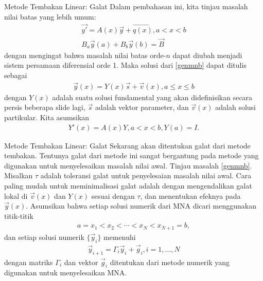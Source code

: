 \documentclass[xcolor={dvipsnames}, 9pt]{beamer}
\begin{document}
	\begin{frame}{Metode Tembakan Linear: Galat}
		Dalam pembahasan ini, kita tinjau masalah nilai batas yang lebih umum:
		\begin{gather}
			\vec{y'} = A(x)\vec{y} + \vec{q(x)}, a<x<b \nonumber \\
			B_a\vec{y}(a) + B_b\vec{y}(b) = \vec{B} \label{genmnb}
		\end{gather}
		dengan mengingat bahwa masalah nilai batas orde-$n$ dapat diubah menjadi sistem persamaan diferensial orde 1. Maka solusi dari \eqref{genmnb} dapat ditulis sebagai
		\begin{align*}
			\vec{y}(x) = Y(x)\vec{s} + \vec{v}(x), a\leq x\leq b
		\end{align*}
		dengan $Y(x)$ adalah suatu solusi fundamental yang akan didefinisikan secara persis beberapa slide lagi, $\vec{s}$ adalah vektor parameter, dan $\vec{v}(x)$ adalah solusi partikular. Kita asumsikan
		\begin{align*}
			Y'(x) = A(x)Y, a<x<b, Y(a) = I.
		\end{align*} 
	\end{frame}
	\begin{frame}{Metode Tembakan Linear: Galat}
		Sekarang akan ditentukan galat dari metode tembakan. Tentunya galat dari metode ini sangat bergantung pada metode yang digunakan untuk menyelesaikan masalah nilai awal. Tinjau masalah \eqref{genmnb}. \newline
		Misalkan $\tau$ adalah toleransi galat untuk penyelesaian masalah nilai awal. Cara paling mudah untuk meminimalisasi galat adalah dengan mengendalikan galat lokal di $\vec{v}(x)$ dan $Y(x)$ sesuai dengan $\tau$, dan menentukan efeknya pada $\vec{y}(x)$. \newline
		Asumsikan bahwa setiap solusi numerik dari MNA dicari menggunakan titik-titik
		\begin{align*}
			a = x_1 < x_2 < \cdots < x_N < x_{N+1} = b,
		\end{align*}
		dan setiap solusi numerik $\{\vec{y}_i\}$ memenuhi
		\begin{align}\label{discretescheme}
			\vec{y}_{i+1} = \Gamma_i\vec{y}_i + \vec{g}_i, i = 1,\dots, N
		\end{align}
		dengan matriks $\Gamma_i$ dan vektor $\vec{g}_i$ ditentukan dari metode numerik yang digunakan untuk menyelesaikan MNA.
	\end{frame}
\end{document}
